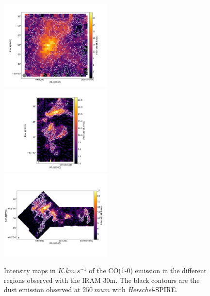 \documentclass[traditabstract]{aa}
\begin{document}
\begin{figure}[h]
  \includegraphics[height=4.5cm,trim=50 40 50 40,clip=true]{Figures/Draco3_stack.png}
  \hspace{3mm}
  \includegraphics[height=4.5cm,trim=50 40 50 40,clip=true]{Figures/Draco6_stack.png} \\
  \includegraphics[height=4.5cm,trim=50 40 50 40,clip=true]{Figures/Draco2+9_rot_stack.png}
  \caption{\label{Draco_CO10} Intensity maps in $K.km.s^{-1}$ of the CO(1-0) emission in the different regions observed with the IRAM 30m. The black contours are the dust emission observed at $250\: mu m$ with \emph{Herschel}-SPIRE.}
\end{figure}
\end{document}
